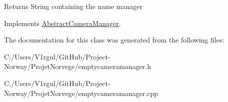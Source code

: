 \begin{DoxyReturn}{Returns}
String containing the name manager 
\end{DoxyReturn}


Implements \hyperlink{class_abstract_camera_manager_a6e4b041842471b9ed42ddd5c9ab260d1}{Abstract\-Camera\-Manager}.



The documentation for this class was generated from the following files\-:\begin{DoxyCompactItemize}
\item 
C\-:/\-Users/\-V1rgul/\-Git\-Hub/\-Project-\/\-Norway/\-Projet\-Norvege/emptycameramanager.\-h\item 
C\-:/\-Users/\-V1rgul/\-Git\-Hub/\-Project-\/\-Norway/\-Projet\-Norvege/emptycameramanager.\-cpp\end{DoxyCompactItemize}

